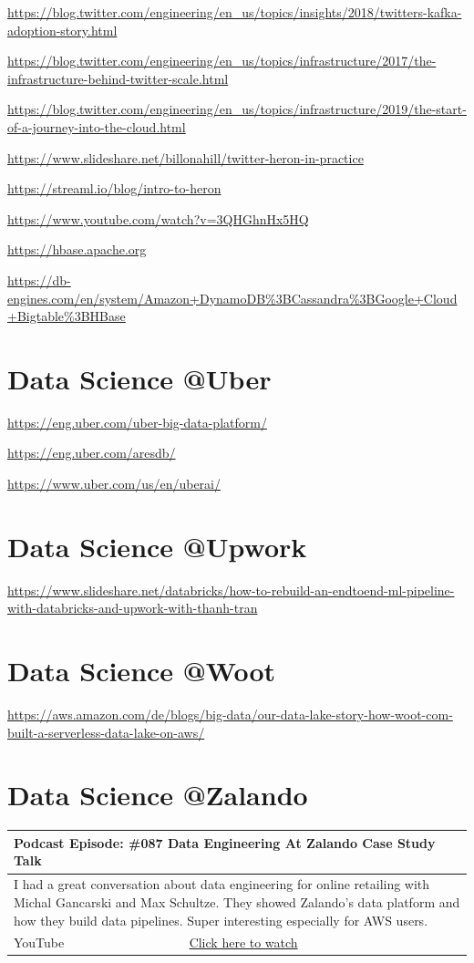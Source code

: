 \documentclass[12pt, numbers=noenddot]{scrreprt} %
\begin{document}
\url{https://blog.twitter.com/engineering/en_us/topics/insights/2018/twitters-kafka-adoption-story.html}

\url{https://blog.twitter.com/engineering/en_us/topics/infrastructure/2017/the-infrastructure-behind-twitter-scale.html}

\url{https://blog.twitter.com/engineering/en_us/topics/infrastructure/2019/the-start-of-a-journey-into-the-cloud.html}

\url{https://www.slideshare.net/billonahill/twitter-heron-in-practice}

\url{https://streaml.io/blog/intro-to-heron}

\url{https://www.youtube.com/watch?v=3QHGhnHx5HQ}

\url{https://hbase.apache.org}

\url{https://db-engines.com/en/system/Amazon+DynamoDB%3BCassandra%3BGoogle+Cloud+Bigtable%3BHBase}


\section{Data Science @Uber}
\url{https://eng.uber.com/uber-big-data-platform/}

\url{https://eng.uber.com/aresdb/}

\url{https://www.uber.com/us/en/uberai/}

\section{Data Science @Upwork}
\url{https://www.slideshare.net/databricks/how-to-rebuild-an-endtoend-ml-pipeline-with-databricks-and-upwork-with-thanh-tran}

\section{Data Science @Woot}
\url{https://aws.amazon.com/de/blogs/big-data/our-data-lake-story-how-woot-com-built-a-serverless-data-lake-on-aws/}

\section{Data Science @Zalando}

\begin{table}[h]
\begin{tabular}{ll}
\hline
\multicolumn{2}{l}{\textbf{Podcast Episode:} \#087 Data Engineering At Zalando Case Study Talk} \\ \hline
\multicolumn{2}{p{15cm}}{I had a great conversation about data engineering for online retailing with Michal Gancarski and Max Schultze. They showed Zalando's data platform and how they build data pipelines. 
Super interesting especially for AWS users. }         \\ \hline
\multicolumn{1}{l|}{YouTube}   & \href{https://youtu.be/IXOLsNA6Hm0}{Click here to watch}   \\  \hline
\end{tabular}
 \label{tbl:087Zalando}
\end{table}
\end{document}
